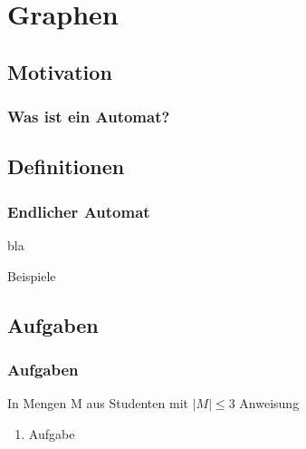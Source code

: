 
\section{Graphen}
\subsection{Motivation}
\begin{frame}[fragile]
  \frametitle{Was ist ein Automat?}
\end{frame}

\subsection{Definitionen}
\begin{frame}[fragile]
  \frametitle{Endlicher Automat}
  \begin{definition}
    \begin{description}
      \item bla
    \end{description}
  \end{definition}\pause
  \begin{exampleblock}{Beispiele}
  \end{exampleblock}
\end{frame}

\subsection{Aufgaben}
\begin{frame}
  \frametitle{Aufgaben}
  \begin{exampleblock}{In Mengen M aus Studenten mit $|M| \leq 3$}
      Anweisung
      \begin{enumerate}
        \item Aufgabe
      \end{enumerate}
  \end{exampleblock}
\end{frame}
